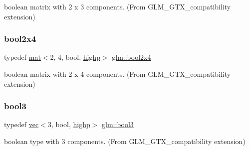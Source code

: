 boolean matrix with 2 x 3 components. (From G\+L\+M\+\_\+\+G\+T\+X\+\_\+compatibility extension) 

\mbox{\label{group__gtx__compatibility_gaa709e6df01dc0ae495c0b5c901a0a181}} 
\subsubsection{\texorpdfstring{bool2x4}{bool2x4}}
{\footnotesize\ttfamily typedef \hyperlink{structglm_1_1mat}{mat}$<$2, 4, bool, \hyperlink{namespaceglm_a36ed105b07c7746804d7fdc7cc90ff25ac6f7eab42eacbb10d59a58e95e362074}{highp}$>$ \hyperlink{group__gtx__compatibility_gaa709e6df01dc0ae495c0b5c901a0a181}{glm\+::bool2x4}}



boolean matrix with 2 x 4 components. (From G\+L\+M\+\_\+\+G\+T\+X\+\_\+compatibility extension) 

\mbox{\label{group__gtx__compatibility_ga9d9411e411bc3bcb7ec64593f5e0908f}} 
\subsubsection{\texorpdfstring{bool3}{bool3}}
{\footnotesize\ttfamily typedef \hyperlink{structglm_1_1vec}{vec}$<$3, bool, \hyperlink{namespaceglm_a36ed105b07c7746804d7fdc7cc90ff25ac6f7eab42eacbb10d59a58e95e362074}{highp}$>$ \hyperlink{group__gtx__compatibility_ga9d9411e411bc3bcb7ec64593f5e0908f}{glm\+::bool3}}



boolean type with 3 components. (From G\+L\+M\+\_\+\+G\+T\+X\+\_\+compatibility extension) 

\mbox{\label{group__gtx__compatibility_ga24674530ea1f5c4e78ba3932dcd7504a}} 
